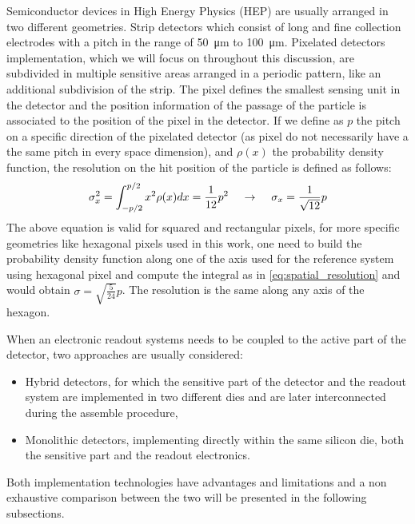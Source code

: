 	Semiconductor devices in High Energy Physics (HEP) are usually arranged in two different geometries. Strip detectors which consist of long and fine collection electrodes with a pitch in the range of \SI{50}{\micro\meter} to \SI{100}{\micro\meter}. Pixelated detectors implementation, which we will focus on throughout this discussion, are subdivided in multiple sensitive areas arranged in a periodic pattern, like an additional subdivision of the strip. The pixel defines the smallest sensing unit in the detector and the position information of the passage of the particle is associated to the position of the pixel in the detector. If we define as $p$ the pitch on a specific direction of the pixelated detector (as pixel do not necessarily have a the same pitch in every space dimension), and $\rho(x)$ the probability density function, the resolution on the hit position of the particle is defined as follows: 
	\begin{equation}
		\sigma_x^2 = \int_{-p/2}^{p/2} x^2 \rho(x) dx = \frac{1}{12} p^2 \hspace{4mm} \rightarrow \hspace{4mm} \sigma_x = \frac{1}{\sqrt{12}} p
		\label{eq:spatial_resolution}
	\end{equation} 
	The above equation is valid for squared and rectangular pixels, for more specific geometries like hexagonal pixels used in this work, one need to build the probability density function along one of the axis used for the reference system using hexagonal pixel and compute the integral as in \eqref{eq:spatial_resolution} and would obtain $\sigma = \sqrt{\frac{5}{24}}p$. The resolution is the same along any axis of the hexagon. \\ 

	When an electronic readout systems needs to be coupled to the active part of the detector, two approaches are usually considered: 
	\begin{itemize}
		\item Hybrid detectors, for which the sensitive part of the detector and the readout system are implemented in two different dies and are later interconnected during the assemble procedure,
		\item Monolithic detectors, implementing directly within the same silicon die, both the sensitive part and the readout electronics. 
	\end{itemize}
		Both implementation technologies have advantages and limitations and a non exhaustive comparison between the two will be presented in the following subsections. 
	
